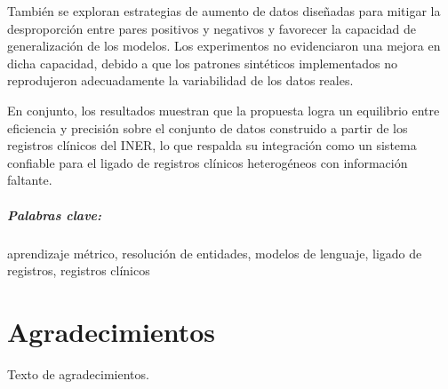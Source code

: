 \documentclass[letterpaper,12pt,twoside]{book}
\begin{document}
También se exploran estrategias de aumento de datos diseñadas para mitigar la desproporción entre pares positivos y negativos y favorecer la capacidad de generalización de los modelos. Los experimentos no evidenciaron una mejora en dicha capacidad, debido a que los patrones sintéticos implementados no reprodujeron adecuadamente la variabilidad de los datos reales.

En conjunto, los resultados muestran que la propuesta logra un equilibrio entre eficiencia y precisión sobre el conjunto de datos construido a partir de los registros clínicos del INER, lo que respalda su integración como un sistema confiable para el ligado de registros clínicos heterogéneos con información faltante.


\paragraph{Palabras clave:} aprendizaje métrico, resolución de entidades, modelos de lenguaje, ligado de registros, registros clínicos

\chapter*{Agradecimientos}

Texto de agradecimientos.

\tableofcontents
\clearpage

\listoffigures
\clearpage

\mainmatter









\backmatter
\printbibliography
\end{document}
